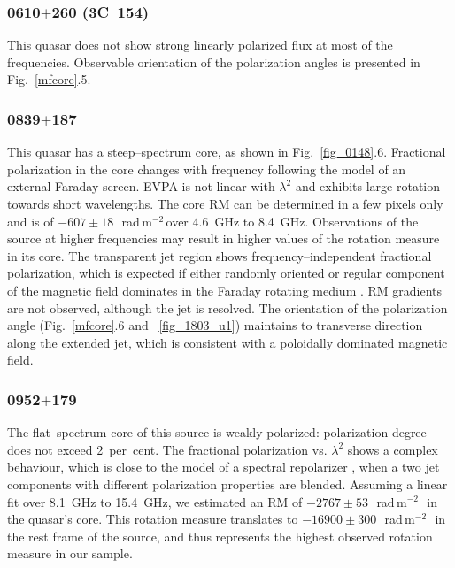 \documentclass[a4paper,fleqn,usenatbib,useAMS]{mnras}
\newcommand{\rmu}{\,rad\,m$^{-2}$\,} %
\begin{document}
\subsubsection{0610$+$260 (3C~154)}
This quasar does not show strong linearly polarized flux at most of the frequencies.
Observable orientation of the polarization angles is presented in Fig.~\ref{mfcore}.5.

\subsubsection{0839$+$187}
This quasar has a steep--spectrum core, as shown in Fig.~\ref{fig_0148}.6. 
Fractional polarization in the core changes with frequency following the model of an external Faraday screen. 
EVPA is not linear with $\lambda^2$ and exhibits large rotation towards short wavelengths. The core RM can be determined in a few pixels only and is of $-607\pm18$~\rmu over 4.6~GHz to 8.4~GHz. Observations of the source at higher frequencies may result in higher values of the rotation measure in its core.
The transparent jet region shows frequency--independent fractional polarization, which is expected if either randomly oriented or regular component of the magnetic field dominates in the Faraday rotating medium \citep[e.g.][]{burn66}.
RM gradients are not observed, although the jet is resolved.
The orientation of the polarization angle (Fig.~\ref{mfcore}.6 and ~\ref{fig_1803_u1}) maintains to transverse direction along the extended jet, which is consistent with a poloidally dominated magnetic field.

\subsubsection{0952$+$179}
The flat--spectrum core of this source is weakly polarized: polarization degree does not exceed 2~per~cent. 
The fractional polarization vs. $\lambda^2$ shows a complex behaviour, which is close to the model of a spectral repolarizer \citep{conway_etal_74}, when a two jet components with different polarization properties are blended.
Assuming a linear fit over 8.1~GHz to 15.4~GHz, we estimated an RM of $-2767\pm53$~\rmu\ in the quasar's core.
This rotation measure translates to $-16900\pm300$~\rmu\ in the rest frame of the source, and thus represents the highest observed rotation measure in our sample.
\end{document}
